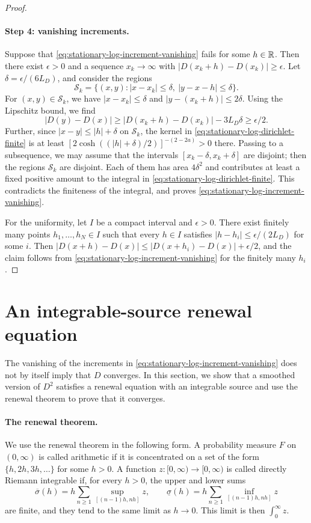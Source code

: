 \begin{proof}
\paragraph{Step 4: vanishing increments.} Suppose that \eqref{eq:stationary-log-increment-vanishing} fails for some $h\in\mathbb R$. Then there exist $\epsilon>0$ and a sequence $x_k\to\infty$ with $|D(x_k+h)-D(x_k)|\ge\epsilon$. Let $\delta=\epsilon/(6L_D)$, and consider the regions
\[
 \mathcal S_k=\bigl\{(x,y):|x-x_k|\le\delta,\ |y-x-h|\le\delta\bigr\}.
\]
For $(x,y)\in\mathcal S_k$, we have $|x-x_k|\le\delta$ and $|y-(x_k+h)|\le2\delta$. Using the Lipschitz bound, we find
\[
 |D(y)-D(x)|\ge|D(x_k+h)-D(x_k)|-3L_D\delta\ge\epsilon/2 .
\]
Further, since $|x-y|\le|h|+\delta$ on $\mathcal S_k$, the kernel in \eqref{eq:stationary-log-dirichlet-finite} is at least $[2\cosh((|h|+\delta)/2)]^{-(2-2a)}>0$ there. Passing to a subsequence, we may assume that the intervals $[x_k-\delta,x_k+\delta]$ are disjoint; then the regions $\mathcal S_k$ are disjoint. Each of them has area $4\delta^2$ and contributes at least a fixed positive amount to the integral in \eqref{eq:stationary-log-dirichlet-finite}. This contradicts the finiteness of the integral, and proves \eqref{eq:stationary-log-increment-vanishing}.

For the uniformity, let $I$ be a compact interval and $\epsilon>0$. There exist finitely many points $h_1,\dots,h_N\in I$ such that every $h\in I$ satisfies $|h-h_i|\le\epsilon/(2L_D)$ for some $i$. Then $|D(x+h)-D(x)|\le|D(x+h_i)-D(x)|+\epsilon/2$, and the claim follows from \eqref{eq:stationary-log-increment-vanishing} for the finitely many $h_i$.
\end{proof}

\section{An integrable-source renewal equation}
\label{subsec:sc-renewal}

The vanishing of the increments in \eqref{eq:stationary-log-increment-vanishing} does not by itself imply that $D$ converges. In this section, we show that a smoothed version of $D^2$ satisfies a renewal equation with an integrable source and use the renewal theorem to prove that it converges.

\paragraph{The renewal theorem.} We use the renewal theorem in the following form. A probability measure $F$ on $(0,\infty)$ is called arithmetic if it is concentrated on a set of the form $\{h,2h,3h,\dots\}$ for some $h>0$. A function $z\colon[0,\infty)\to[0,\infty)$ is called directly Riemann integrable if, for every $h>0$, the upper and lower sums
\[
 \overline\sigma(h)=h\sum_{n\ge1}\sup_{[(n-1)h,nh]}z,\qquad
 \underline\sigma(h)=h\sum_{n\ge1}\inf_{[(n-1)h,nh]}z
\]
are finite, and they tend to the same limit as $h\to0$. This limit is then $\int_0^\infty z$.

